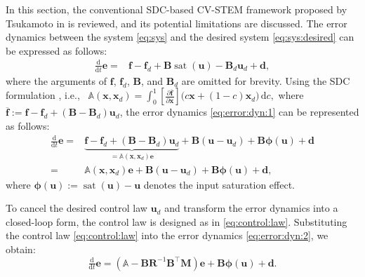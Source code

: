 \documentclass{ifacconf}
\newcommand\ie{\textrm{i.e.,\ }}
\newcommand*{\mv}[1]{\boldsymbol{#1}} %
\newcommand*{\mm}[1]{\boldsymbol{#1}} %
\DeclareMathOperator{\mysat}{{sat}}       %
\newcommand\der{\mathrm d}
\newcommand*{\ddtt}{
   \tfrac{\der}{\der t}
}
\newcommand*{\pptfrac}[2]{
   \tfrac{\partial {#1}}{\partial {#2}}
}
\begin{document}
In this section, the conventional SDC-based CV-STEM framework proposed by Tsukamoto {\etal} in \citep{Tsukamoto:2021aa} is reviewed, and its potential limitations are discussed.
The error dynamics between the system \eqref{eq:sys} and the desired system \eqref{eq:sys:desired} can be expressed as follows:
\begin{equation} \label{eq:error:dyn:1}
   \begin{aligned}
      \ddtt\mv{e}
      =&
      \mv{f}-\mv{f}_d
      + \mm{B} \mysat(\mv{u})
      - \mm{B}_d \mv{u}_d
      + \mv{d}
      ,
   \end{aligned}
\end{equation}
where the arguments of $\mv{f}$, $\mv{f}_d$, $\mm{B}$, and $\mm{B}_d$ are omitted for brevity.
Using the SDC formulation \citep{Dani:2015aa}, \ie 
$
   \mathbb{A}(\mv{x},\mv{x}_d)
   =
   \int_0^1 
   \left[
      \pptfrac{\overline{\mv{f}}}{\mv{x}}
   \right]
   \big(
      c \mv{x} + (1-c) \mv{x}_d
   \big)
   \,\der c
   ,
$ 
where $\overline{\mv{f}}:=\mv{f}-\mv{f}_d+(\mm{B}-\mm{B}_d)\mv{u}_d$, the error dynamics \eqref{eq:error:dyn:1} can be represented as follows:
\begin{equation} \label{eq:error:dyn:2}
   \begin{aligned}
      \ddtt\mv{e}
      =&
      \underbrace
      {
         \mv{f}-\mv{f}_d
         +
         (
            \mm{B} 
            - \mm{B}_d 
         ) \mv{u}_d
      }_{= \mathbb{A}(\mv{x},\mv{x}_d) \mv{e}}
      + \mm{B} 
      (
         \mv{u} - \mv{u}_d
      )
      + \mm{B} \mv{\phi}(\mv{u}) + \mv{d}
      \\
      =&
      \mathbb{A}(\mv{x},\mv{x}_d)
      \mv{e}
      + \mm{B} 
      (\mv{u} - \mv{u}_d)
      + \mm{B} \mv{\phi}(\mv{u}) + \mv{d}
      ,
   \end{aligned}
\end{equation}
where $\mv{\phi}(\mv{u}):=\mysat(\mv{u}) - \mv{u}$ denotes the input saturation effect.

To cancel the desired control law $\mv{u}_d$ and transform the error dynamics into a closed-loop form, the control law is designed as in \eqref{eq:control:law}. 
Substituting the control law \eqref{eq:control:law} into the error dynamics \eqref{eq:error:dyn:2}, we obtain:
\begin{equation} \label{eq:error:dyn:3}
   \ddtt\mv{e}
   \!=\!
   \left(
      \mathbb{A} - \mm{B} \mm{R}^{-1} \mm{B} ^\top \mm{M}
   \right)
   \mv{e}
   + \mm{B} \mv{\phi}(\mv{u}) + \mv{d}
   .
\end{equation}
\end{document}

